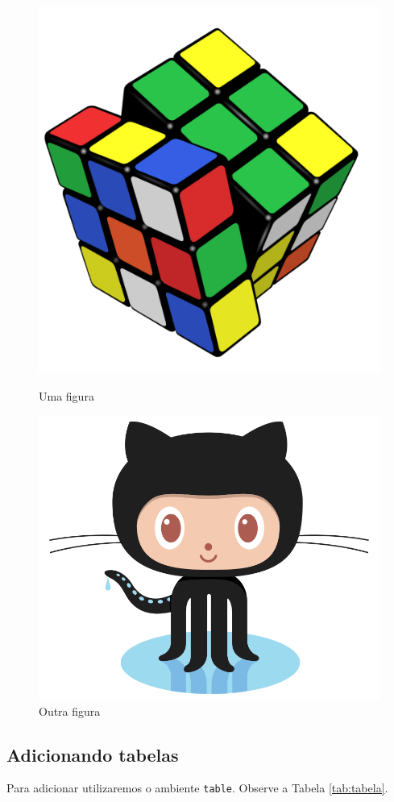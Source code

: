 \documentclass[11pt]{article}
\begin{document}
\begin{figure}[!h]
  \centering
  \begin{minipage}[b]{0.4\textwidth}
  	\centering
    \includegraphics[width=.5\textwidth]{rubiks.png}   %
    \caption{Uma figura}
  \end{minipage}
  \begin{minipage}[b]{0.4\textwidth}
  	\centering
    \includegraphics[width=.5\textwidth]{logo.png}     %
    \caption{Outra figura}
  \end{minipage}
\end{figure}


\subsection{Adicionando tabelas}

Para adicionar utilizaremos o ambiente \texttt{table}. Observe a Tabela \ref{tab:tabela}.
\end{document}
